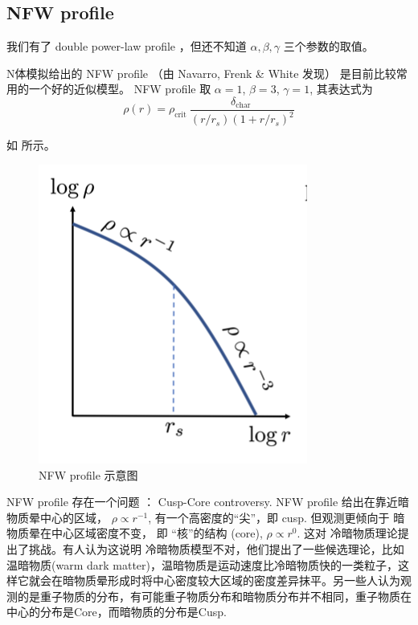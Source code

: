 \subsection{NFW profile}

我们有了 double power-law profile ，但还不知道 $\alpha, \beta, \gamma$ 三个参数的取值。

N体模拟给出的 NFW profile （由 Navarro, Frenk \& White 发现） 是目前比较常用的一个好的近似模型。
NFW profile 取 $\alpha =1$, $\beta=3$, $\gamma =1$,  其表达式为
\begin{equation} \label{eq:NFW}
    \rho(r)=\rho_{\text {crit }} \frac{\delta_{\text {char }}}{\left(r / r_{s}\right)\left(1+r / r_{s}\right)^{2}}
\end{equation}

如   所示。
\begin{figure}[!hbtp]
	\centering 
	\includegraphics[width=1.0\linewidth]{NFW.png}
	\caption{NFW profile 示意图}
    \label{fig:NFW}
\end{figure}

NFW profile 存在一个问题 ： Cusp-Core controversy. 
NFW profile 给出在靠近暗物质晕中心的区域， $\rho \propto r^{-1}$, 有一个高密度的“尖”，即 cusp.
但观测更倾向于 暗物质晕在中心区域密度不变， 即 “核”的结构 (core), $\rho \propto r^0$.
这对 冷暗物质理论提出了挑战。有人认为这说明 冷暗物质模型不对，他们提出了一些候选理论，比如温暗物质(warm dark matter)，温暗物质是运动速度比冷暗物质快的一类粒子，这样它就会在暗物质晕形成时将中心密度较大区域的密度差异抹平。另一些人认为观测的是重子物质的分布，有可能重子物质分布和暗物质分布并不相同，重子物质在中心的分布是Core，而暗物质的分布是Cusp.
